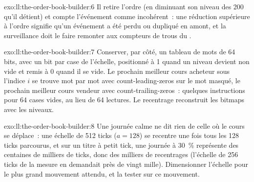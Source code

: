 \begin{solution}{exo:ll:the-order-book-builder:6}
Il retire l'ordre (en diminuant son niveau des 200 qu'il détient) et compte l'événement comme incohérent~: une réduction supérieure
à l'ordre signifie qu'un événement a été perdu ou dupliqué en amont, et la surveillance doit le faire remonter aux compteurs de
trous du .
\end{solution}

\begin{solution}{exo:ll:the-order-book-builder:7}
Conserver, par côté, un tableau de mots de 64 bits, avec un bit par case de l'échelle, positionné à 1 quand un niveau devient non vide
et remis à 0 quand il se vide. Le prochain meilleur cours acheteur sous l'indice $i$ se trouve mot par mot avec count-leading-zeros sur le mot masqué, le prochain meilleur cours vendeur
avec count-trailing-zeros~: quelques instructions pour 64 cases vides, au lieu de 64 lectures. Le recentrage reconstruit les bitmaps avec les
niveaux.
\end{solution}

\begin{solution}{exo:ll:the-order-book-builder:8}
Une journée calme ne dit rien de celle où le cours se déplace~: une échelle de 512 ticks ($a = 128$) se recentre une fois tous les 128 ticks parcourus,
et sur un titre à petit tick, une journée à 30~\% représente des centaines de milliers de ticks, donc des milliers de recentrages
(l'échelle de 256 ticks de la mesure en demandait près de vingt mille). Dimensionner l'échelle pour le plus grand mouvement attendu, et la tester sur ce mouvement.
\end{solution}

